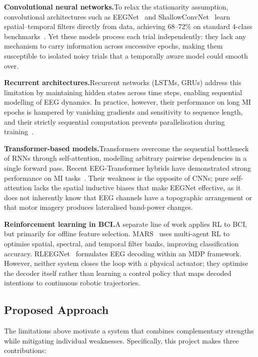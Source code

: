 \documentclass[12pt, a4paper]{article}
\begin{document}
\textbf{Convolutional neural networks.}\quad To relax the stationarity assumption, convolutional architectures such as EEGNet~\cite{lawhern2018eegnet} and ShallowConvNet~\cite{schirrmeister2017deep} learn spatial--temporal filters directly from data, achieving 68--72\% on standard 4-class benchmarks~\cite{hameed2025enhancing}. Yet these models process each trial independently: they lack any mechanism to carry information across successive epochs, making them susceptible to isolated noisy trials that a temporally aware model could smooth over.

\textbf{Recurrent architectures.}\quad Recurrent networks (LSTMs, GRUs) address this limitation by maintaining hidden states across time steps, enabling sequential modelling of EEG dynamics. In practice, however, their performance on long MI epochs is hampered by vanishing gradients and sensitivity to sequence length, and their strictly sequential computation prevents parallelisation during training~\cite{vaswani2017attention}.

\textbf{Transformer-based models.}\quad Transformers overcome the sequential bottleneck of RNNs through self-attention, modelling arbitrary pairwise dependencies in a single forward pass. Recent EEG-Transformer hybrids have demonstrated strong performance on MI tasks~\cite{song2022eeg}. Their weakness is the opposite of CNNs; pure self-attention lacks the spatial inductive biases that make EEGNet effective, as it does not inherently know that EEG channels have a topographic arrangement or that motor imagery produces lateralised band-power changes.

\textbf{Reinforcement learning in BCI.}\quad A separate line of work applies RL to BCI, but primarily for offline feature selection. MARS~\cite{shin2024mars} uses multi-agent RL to optimise spatial, spectral, and temporal filter banks, improving classification accuracy. RLEEGNet~\cite{nallani2024rleegnet} formulates EEG decoding within an MDP framework. However, neither system closes the loop with a physical actuator; they optimise the decoder itself rather than learning a control policy that maps decoded intentions to continuous robotic trajectories.

\subsection{Proposed Approach}

The limitations above motivate a system that combines complementary strengths while mitigating individual weaknesses. Specifically, this project makes three contributions:
\end{document}
